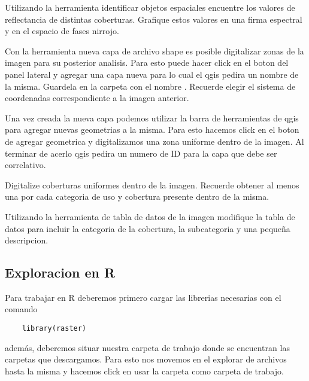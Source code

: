 \documentclass[a4paper]{article}
\begin{document}
 \begin{act}
    Utilizando la herramienta identificar objetos espaciales encuentre los
    valores de reflectancia de distintas coberturas. Grafique estos  valores en
    una firma espectral y en el espacio de fases nirrojo.
 \end{act}

 Con la herramienta nueva capa de archivo shape es posible digitalizar zonas de
 la imagen para su posterior analisis. Para esto puede hacer click en el boton
 del panel lateral y agregar una capa nueva para lo cual el qgis pedira un
 nombre de la misma. Guardela en la carpeta  con el nombre
 . Recuerde elegir el sistema de coordenadas correspondiente a
 la imagen anterior.

 Una vez creada la nueva capa podemos utilizar la barra de herramientas de qgis
 para agregar nuevas geometrias a la misma. Para esto hacemos click en el boton
 de agregar geometrica y digitalizamos una zona uniforme dentro de la imagen. Al
 terminar de acerlo qgis pedira un numero de ID para la capa que debe ser
 correlativo.
 
 \begin{act}
    Digitalize coberturas uniformes dentro de la imagen. Recuerde obtener al
    menos una por cada categoria de uso y cobertura presente dentro de la misma.
 \end{act}

 \begin{act}
    Utilizando la herramienta de tabla de datos de la imagen modifique la tabla
    de datos para incluir la categoria de la cobertura, la subcategoria y una 
    pequeña descripcion.
 \end{act}


\subsection{Exploracion en R}
\label{sub:fep:r}
 Para trabajar en R deberemos primero cargar las librerias necesarias con el
 comando

 \begin{lstlisting}
    library(raster)
 \end{lstlisting}

 además, deberemos situar nuestra carpeta de trabajo donde se encuentran las
 carpetas que descargamos. Para esto nos movemos en el explorar de archivos
 hasta la misma y hacemos click en usar la carpeta como carpeta de trabajo.
\end{document}
